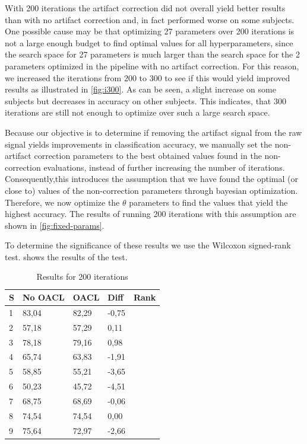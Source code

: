 With 200 iterations the artifact correction did not overall yield better results than with no artifact correction and, in fact performed worse on some subjects. One possible cause may be that optimizing 27 parameters over 200 iterations is not a large enough budget to find optimal values for all hyperparameters, since the search space for 27 parameters is much larger than the search space for the 2 parameters optimized in the pipeline with no artifact correction. For this reason, we increased the iterations from 200 to 300 to see if this would yield improved results as illustrated in \cref{fig:i300}. As can be seen, a slight increase on some subjects but decreases in accuracy on other subjects. This indicates, that 300 iterations are still not enough to optimize over such a large search space. 

Because our objective is to determine if removing the artifact signal from the raw signal yields improvements in classification accuracy, we manually set the non-artifact correction parameters to the best obtained values found in the non-correction evaluations, instead of further increasing the number of iterations. Consequently,this introduces the assumption that we have found the optimal (or close to) values of the non-correction parameters through bayesian optimization. Therefore, we now optimize the $\theta$ parameters to find the values that yield the highest accuracy. The results of running 200 iterations with this assumption are shown in \cref{fig:fixed-params}. 

To determine the significance of these results we use the Wilcoxon signed-rank test.  shows the results of the test.

\begin{table}[H]
	\centering
	\caption{Results for 200 iterations}
	\label{fig:resultsi200}
	\begin{tabular}{@{}l|llll@{}}
		\toprule
		S & No OACL & OACL & Diff & Rank \\ \midrule
		1 &   83,04            & 82,29           & -0,75 &      \\
		2 &   57,18            & 57,29   	     & 0,11 &      \\
		3 &   78,18            & 79,16           & 0,98 &      \\
		4 &   65,74            & 63,83           & -1,91 &      \\
		5 &   58,85            & 55,21           & -3,65 &      \\
		6 &   50,23            & 45,72           & -4,51 &      \\
		7 &   68,75            & 68,69           & -0,06&      \\
		8 &   74,54            & 74,54           & 0,00 &      \\
		9 &   75,64            & 72,97           & -2,66 &      \\ \bottomrule
	\end{tabular}
\end{table}

